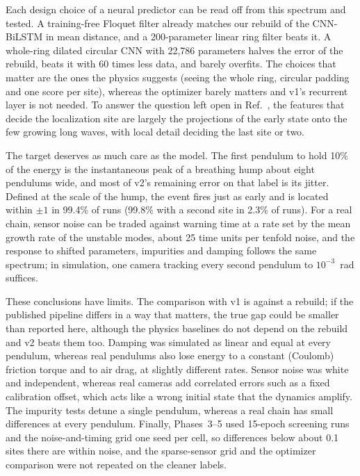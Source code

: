 \documentclass[11pt]{article}
\begin{document}
Each design choice of a neural predictor can be read off from this spectrum and tested. A training-free Floquet filter already matches our rebuild of the CNN-BiLSTM in mean distance, and a 200-parameter linear ring filter beats it. A whole-ring dilated circular CNN with 22,786 parameters halves the error of the rebuild, beats it with 60 times less data, and barely overfits. The choices that matter are the ones the physics suggests (seeing the whole ring, circular padding and one score per site), whereas the optimizer barely matters and v1's recurrent layer is not needed. To answer the question left open in Ref.~\cite{mittal2026jand}, the features that decide the localization site are largely the projections of the early state onto the few growing long waves, with local detail deciding the last site or two.

The target deserves as much care as the model. The first pendulum to hold 10\% of the energy is the instantaneous peak of a breathing hump about eight pendulums wide, and most of v2's remaining error on that label is its jitter. Defined at the scale of the hump, the event fires just as early and is located within $\pm1$ in 99.4\% of runs (99.8\% with a second site in 2.3\% of runs). For a real chain, sensor noise can be traded against warning time at a rate set by the mean growth rate of the unstable modes, about 25 time units per tenfold noise, and the response to shifted parameters, impurities and damping follows the same spectrum; in simulation, one camera tracking every second pendulum to $10^{-3}$~rad suffices.

These conclusions have limits. The comparison with v1 is against a rebuild; if the published pipeline differs in a way that matters, the true gap could be smaller than reported here, although the physics baselines do not depend on the rebuild and v2 beats them too. Damping was simulated as linear and equal at every pendulum, whereas real pendulums also lose energy to a constant (Coulomb) friction torque and to air drag, at slightly different rates. Sensor noise was white and independent, whereas real cameras add correlated errors such as a fixed calibration offset, which acts like a wrong initial state that the dynamics amplify. The impurity tests detune a single pendulum, whereas a real chain has small differences at every pendulum. Finally, Phases~3--5 used 15-epoch screening runs and the noise-and-timing grid one seed per cell, so differences below about 0.1 sites there are within noise, and the sparse-sensor grid and the optimizer comparison were not repeated on the cleaner labels.
\end{document}
